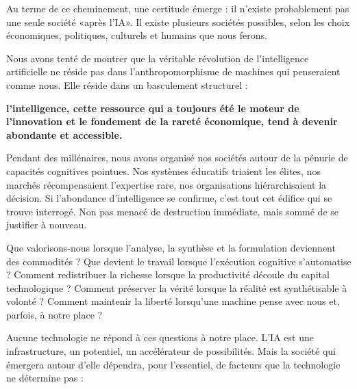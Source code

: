 
Au terme de ce cheminement, une certitude émerge : il n'existe probablement pas une seule société «après l'IA». Il existe plusieurs sociétés possibles, selon les choix économiques, politiques, culturels et humains que nous ferons.

Nous avons tenté de montrer que la véritable révolution de l'intelligence artificielle ne réside pas dans l'anthropomorphisme de machines qui penseraient comme nous. Elle réside dans un basculement structurel :

\textbf{l'intelligence, cette ressource qui a toujours été le moteur de l'innovation et le fondement de la rareté économique, tend à devenir abondante et accessible.}

Pendant des millénaires, nous avons organisé nos sociétés autour de la pénurie de capacités cognitives pointues. Nos systèmes éducatifs triaient les élites, nos marchés récompensaient l'expertise rare, nos organisations hiérarchisaient la décision. Si l'abondance d'intelligence se confirme, c'est tout cet édifice qui se trouve interrogé. Non pas menacé de destruction immédiate, mais sommé de se justifier à nouveau.

Que valorisons-nous lorsque l'analyse, la synthèse et la formulation deviennent des commodités ? Que devient le travail lorsque l'exécution cognitive s'automatise ? Comment redistribuer la richesse lorsque la productivité découle du capital technologique ? Comment préserver la vérité lorsque la réalité est synthétisable à volonté ? Comment maintenir la liberté lorsqu'une machine pense avec nous et, parfois, à notre place ?

Aucune technologie ne répond à ces questions à notre place. L'IA est une infrastructure, un potentiel, un accélérateur de possibilités. Mais la société qui émergera autour d'elle dépendra, pour l'essentiel, de facteurs que la technologie ne détermine pas :

